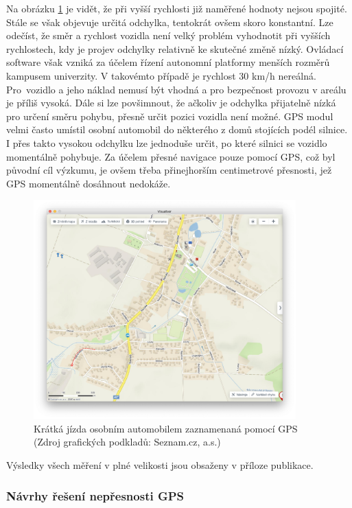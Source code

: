 \documentclass[czech, bachelor]{diploma}
\begin{document}
Na obrázku \ref{fig:olsinaautem} je vidět, že při vyšší rychlosti již naměřené hodnoty nejsou spojité. Stále se však objevuje
určitá odchylka, tentokrát ovšem skoro konstantní. Lze odečíst, že směr a rychlost vozidla není velký problém vyhodnotit při
vyšších rychlostech, kdy je projev odchylky relativně ke skutečné změně nízký. Ovládací software však vzniká za účelem řízení
autonomní platformy menších rozměrů kampusem univerzity. V takovémto případě je rychlost 30 km/h nereálná. Pro~vozidlo a jeho
náklad nemusí být vhodná a pro bezpečnost provozu v areálu je příliš vysoká. Dále si lze povšimnout, že ačkoliv je odchylka
přijatelně nízká pro určení směru pohybu, přesně určit pozici vozidla není možné. GPS modul velmi často umístil osobní automobil
do některého z domů stojících podél silnice. I přes takto vysokou odchylku lze jednoduše určit, po které silnici se vozidlo
momentálně pohybuje. Za účelem přesné navigace pouze pomocí GPS, což byl původní cíl výzkumu, je ovšem třeba přinejhorším
centimetrové přesnosti, jež GPS momentálně dosáhnout nedokáže.

\begin{figure}
    \centering
    \includegraphics[width=0.9\textwidth]{Figures/olsinaautem.png}
    \caption{Krátká jízda osobním automobilem zaznamenaná pomocí GPS (Zdroj grafických podkladů: Seznam.cz, a.s.)}
    \label{fig:olsinaautem}
\end{figure}

Výsledky všech měření v plné velikosti jsou obsaženy v příloze publikace.

\subsubsection{Návrhy řešení nepřesnosti GPS}
\end{document}
